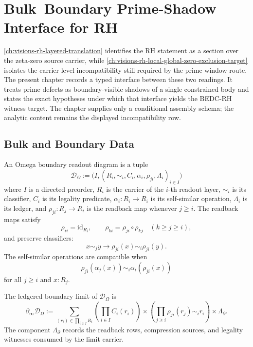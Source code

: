 \chapter{Bulk--Boundary Prime-Shadow Interface for RH}
\label{ch:visions-rh-bulk-boundary-prime-shadow-interface}

\autoref{ch:visions-rh-layered-translation} identifies the RH statement as
a section over the zeta-zero source carrier, while
\autoref{ch:visions-rh-local-global-zero-exclusion-target} isolates the
carrier-level incompatibility still required by the prime-window route. The
present chapter records a typed interface between these two readings. It
treats prime defects as boundary-visible shadows of a single constrained
body and states the exact hypotheses under which that interface yields the
BEDC-RH witness target. The chapter supplies only a conditional assembly
schema; the analytic content remains the displayed incompatibility row.

\section{Bulk and Boundary Data}
\label{sec:rh-bulk-boundary-data}

\begin{definition}
\label{def:rh-bulk-boundary-readout-diagram}
An Omega boundary readout diagram is a tuple
$$
\mathcal D_{\Omega}
:=
\bigl(I,(R_i,\sim_i,C_i,\alpha_i,\rho_{ji},\Lambda_i)_{i\in I}\bigr)
$$
where $I$ is a directed preorder, $R_i$ is the carrier of the $i$-th
readout layer, $\sim_i$ is its classifier, $C_i$ is its legality
predicate, $\alpha_i:R_i\to R_i$ is its self-similar operation,
$\Lambda_i$ is its ledger, and $\rho_{ji}:R_j\to R_i$ is the readback map
whenever $j\ge i$. The readback maps satisfy
$$
\rho_{ii}=\mathrm{id}_{R_i},
\qquad
\rho_{ki}=\rho_{ji}\circ\rho_{kj}
\quad(k\ge j\ge i),
$$
and preserve classifiers:
$$
x\sim_j y
\to
\rho_{ji}(x)\sim_i\rho_{ji}(y).
$$
The self-similar operations are compatible when
$$
\rho_{ji}(\alpha_j(x))
\sim_i
\alpha_i(\rho_{ji}(x))
$$
for all $j\ge i$ and $x:R_j$.
\end{definition}

\begin{definition}
\label{def:rh-bulk-boundary-limit-with-ledger}
The ledgered boundary limit of $\mathcal D_{\Omega}$ is
$$
\partial_{\infty}\mathcal D_{\Omega}
:=
\sum_{(r_i)\in\prod_{i\in I}R_i}
\left(
\prod_{i\in I}C_i(r_i)
\right)
\times
\left(
\prod_{j\ge i}
\rho_{ji}(r_j)\sim_i r_i
\right)
\times
\Lambda_{\partial}.
$$
The component $\Lambda_{\partial}$ records the readback rows, compression
sources, and legality witnesses consumed by the limit carrier.
\end{definition}

